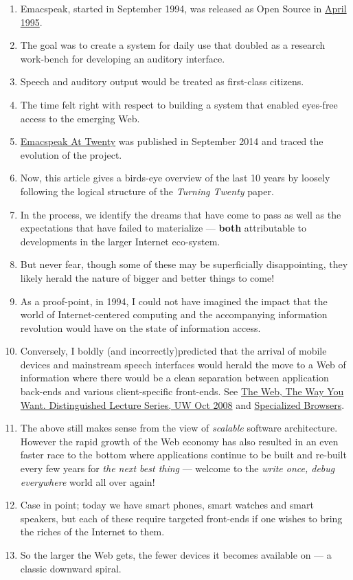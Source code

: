 \documentclass[11pt]{article}
\begin{document}
\begin{enumerate}
\item Emacspeak, started in September 1994, was released as Open
Source in \href{https://tvraman.github.io/emacspeak//web/releases/release-3.0.html}{April 1995}.
\item The goal was to create a system for daily use that  doubled
as a research work-bench for developing an auditory interface.
\item Speech and auditory output would be  treated as 
first-class citizens.
\item The time felt right with respect to building a  system 
that enabled  eyes-free access to the emerging Web.
\item \href{https://emacspeak.sourceforge.net/turning-twenty.html}{Emacspeak At Twenty}  was published in September 2014 and  traced the
evolution of the project.
\item Now, this article gives a birds-eye overview of the last 10 years
by loosely following the logical structure of the  \emph{Turning Twenty} paper.
\item In the process, we identify the dreams that have come to pass as
well as the expectations that have failed to materialize --- \textbf{both}
attributable  to developments in the larger Internet eco-system.
\item But never fear, though  some of these
may be   superficially
disappointing, they likely herald the nature of bigger and better
things to come!
\item As a proof-point, in 1994, I could not have imagined the impact
that the world of Internet-centered  computing and the accompanying
information revolution would have  on the state of information
access.
\item Conversely, I boldly  (and incorrectly)predicted  that the arrival of mobile
devices and mainstream speech interfaces would herald the move to
a Web of information where there would be a clean separation
between application back-ends and various client-specific
front-ends. See \href{http://www.cs.washington.edu/htbin-post/mvis/mvis?ID=636}{The Web, The Way You Want.  Distinguished Lecture
Series, UW Oct 2008} and \href{https://emacspeak.sourceforge.net/raman/publications/specialized-browsers/}{Specialized Browsers}.
\item The above still makes sense from the view of  \emph{scalable} software architecture. However the rapid growth of the Web economy has also
resulted in an even faster race to the bottom where applications
continue to be built and re-built every few years for \emph{the next
best thing} --- welcome to the \emph{write once, debug everywhere}
world all over again!
\item Case in point; today we have smart phones, smart watches  and smart speakers,
but each of these  require targeted front-ends  
if one wishes to  bring the riches of the Internet to them.
\item So the larger the Web gets, the fewer devices it becomes
available  on --- a classic downward spiral.
\end{enumerate}
\end{document}
